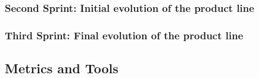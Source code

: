 \subsubsection{Second Sprint: Initial evolution of the product line}


\subsubsection{Third Sprint: Final evolution of the product line}




\subsection{Metrics and Tools}


